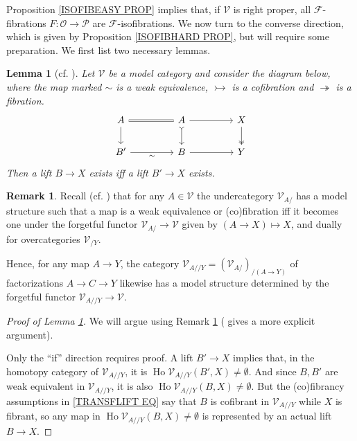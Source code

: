 \documentclass[a4paper,10pt
,draft
]{article}%
\numberwithin{equation}{section}
\numberwithin{figure}{section}
\newtheorem{lemma}[equation]{Lemma}%
\theoremstyle{definition} %
\newtheorem{remark}[equation]{Remark}%
\DeclareMathOperator{\Ho}{Ho}
\newcommand{\F}{\ensuremath{\mathcal F}}
\newcommand{\V}{\ensuremath{\mathcal V}}
\newcommand{\1}{\ensuremath{\mathbbm 1}}%
\begin{document}
Proposition \ref{ISOFIBEASY PROP}
implies that, if $\V$ is right proper,
all $\F$-fibrations $F \colon \mathcal{O} \to \mathcal{P}$ are $\F$-isofibrations.
%
We now turn to the converse direction, which
is given by Proposition \ref{ISOFIBHARD PROP}, 
but will require some preparation.
We first list two necessary lemmas.



\begin{lemma}[{cf. \cite[Lemma 2.6]{Ber07b}}]
	\label{TRANSFLIFT LEMMA}
	Let $\V$ be a model category and consider the diagram below, 
	where the map marked $\sim$ is a weak equivalence, 
	$\rightarrowtail$ is a cofibration
	and $\twoheadrightarrow$ is a fibration.
	\begin{equation}\label{TRANSFLIFT EQ}
	\begin{tikzcd}[column sep = 45pt]
	A
	\ar{d}
	\arrow[equal]{r}
	&
	A \ar{r}
	\arrow[rightarrowtail]{d}
	&
	X \arrow[twoheadrightarrow]{d}
	\\
	B'
	\arrow{r}[swap]{\sim}
	&
	B\ar{r}
	&
	Y
	\end{tikzcd}
	\end{equation}
	Then a lift $B \to X$ %
	exists iff
	a lift $B' \to X$ %
	exists.
\end{lemma}


\begin{remark}\label{UNDEROVER REM}
	Recall (cf. \cite[Rem. 3.10]{DS95})
	that for any $A \in \V$ the undercategory $\V_{A/}$
	has a model structure such that a map is a 
	weak equivalence or (co)fibration iff it becomes one under the 
	forgetful functor
	$\V_{A/} \to \V$ given by $(A \to X) \mapsto X$,
	and dually for overcategories $\V_{/Y}$.
	
	Hence, for any map $A \to Y$,
	the category 
	$\V_{A//Y} = \left(\V_{A/}\right)_{/(A\to Y)}$
	of factorizations $A \to C \to Y$
	likewise has a model structure determined by the forgetful functor
	$\V_{A//Y} \to \V$.
\end{remark}


\begin{proof}[Proof of Lemma \ref{TRANSFLIFT LEMMA}]
	We will argue using Remark \ref{UNDEROVER REM}
	(\cite{Ber07b} gives a more explicit argument).
	
	Only the ``if'' direction requires proof.
	A lift $B' \to X$ implies that,
	in the homotopy category of $\V_{A//Y}$, it is
	$\Ho \V_{A//Y}(B',X) \neq \emptyset$. 
	And since $B,B'$ are weak equivalent in 
	$\V_{A//Y}$, it is also 
	$\Ho \V_{A//Y}(B,X) \neq \emptyset$.
	But the (co)fibrancy assumptions in \eqref{TRANSFLIFT EQ}
	say that $B$ is cofibrant in $\V_{A//Y}$ while 
	$X$ is fibrant, so any map in $\Ho \V_{A//Y}(B,X) \neq \emptyset$
	is represented by an actual lift $B \to X$.
\end{proof}
\end{document}
